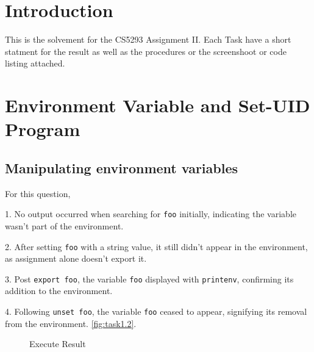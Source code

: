 \documentclass[a4paper,11pt]{article}
\begin{document}

{\hypersetup{hidelinks}
\tableofcontents
}
\newpage
\section{Introduction}
This is the solvement for the CS5293 Assignment II. Each Task have a short statment for the result as well as the procedures or the screenshoot or code listing attached.

\section{Environment Variable and Set-UID Program}

\subsection{Manipulating environment variables}\label{sec:task1}

For this question, 

1. No output occurred when searching for \verb|foo| initially, indicating the variable wasn't part of the environment.

2. After setting \verb|foo| with a string value, it still didn't appear in the environment, as assignment alone doesn't export it.

3. Post \verb|export foo|, the variable \verb|foo| displayed with \verb|printenv|, confirming its addition to the environment.

4. Following \verb|unset foo|, the variable \verb|foo| ceased to appear, signifying its removal from the environment. \ref{fig:task1.2}. 

\begin{figure}[h]
    \centering
    \hfill
    \hfill
    \caption{Execute Result}\label{fig:task1}
\end{figure}
\end{document}
